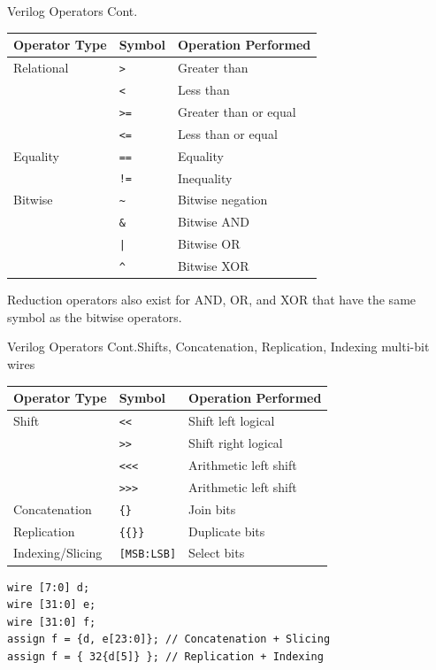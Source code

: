 \documentclass{beamer}
\begin{document}
\begin{frame}[fragile]{Verilog Operators Cont.}
	\begin{center}
		\begin{tabular}{l | l | l}
			Operator Type & Symbol & Operation Performed \\ \hline
			Relational & \texttt{>} & Greater than \\ \hline
			& \texttt{<} & Less than \\ \hline
			& \texttt{>=} & Greater than or equal \\ \hline
			& \texttt{<=} & Less than or equal \\ \hline
			Equality & \texttt{==} & Equality \\ \hline
			& \texttt{!=} & Inequality \\ \hline
			Bitwise & \texttt{\~} & Bitwise negation \\ \hline
			& \texttt{\&} & Bitwise AND \\ \hline
			& \texttt{|} & Bitwise OR \\ \hline
			& \texttt{\^} & Bitwise XOR \\ \hline
		\end{tabular}
	\end{center}
	Reduction operators also exist for AND, OR, and XOR that have the same symbol as the bitwise operators.
\end{frame}

\begin{frame}[fragile]{Verilog Operators Cont.}{Shifts, Concatenation, Replication, Indexing multi-bit wires}
	\begin{center}
		\begin{tabular}{l | l | l}
			Operator Type & Symbol & Operation Performed \\ \hline
			Shift & \texttt{<<} & Shift left logical \\ \hline
			& \texttt{>>} & Shift right logical \\ \hline
			& \texttt{<<<} & Arithmetic left shift \\ \hline
			& \texttt{>>>} & Arithmetic left shift \\ \hline
			Concatenation & \texttt{\{\}} & Join bits \\ \hline
			Replication & \texttt{\{\{\}\}} & Duplicate bits \\ \hline
			Indexing/Slicing & \texttt{[MSB:LSB]} & Select bits \\ \hline
		\end{tabular}
	\end{center}
\begin{verbatim}
wire [7:0] d;
wire [31:0] e;
wire [31:0] f;
assign f = {d, e[23:0]}; // Concatenation + Slicing
assign f = { 32{d[5]} }; // Replication + Indexing
\end{verbatim}
\end{frame}
\end{document}
